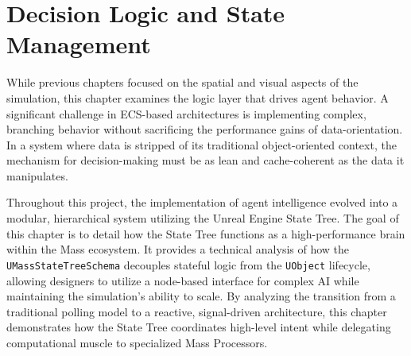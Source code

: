 \chapter{Decision Logic and State Management}
\label{sec:StateManagement}

While previous chapters focused on the spatial and visual aspects of the simulation, this chapter examines the logic layer that drives agent behavior. A significant challenge in ECS-based architectures is implementing complex, branching behavior without sacrificing the performance gains of data-orientation. In a system where data is stripped of its traditional object-oriented context, the mechanism for decision-making must be as lean and cache-coherent as the data it manipulates.

Throughout this project, the implementation of agent intelligence evolved into a modular, hierarchical system utilizing the Unreal Engine State Tree. The goal of this chapter is to detail how the State Tree functions as a high-performance brain within the Mass ecosystem. It provides a technical analysis of how the \texttt{UMassStateTreeSchema} decouples stateful logic from the \texttt{UObject} lifecycle, allowing designers to utilize a node-based interface for complex AI while maintaining the simulation’s ability to scale. By analyzing the transition from a traditional polling model to a reactive, signal-driven architecture, this chapter demonstrates how the State Tree coordinates high-level intent while delegating computational muscle to specialized Mass Processors.




